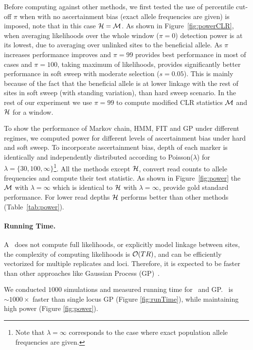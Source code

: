 \documentclass[11pt]{article}
\def\comale{\text{{\sc Comale}}}
\begin{document}
Before computing against other methods, we first tested the use of
percentile cut-off $\pi$ when with no ascertainment bias (exact allele frequencies are given) is imposed, note that in this case ${\cal H}={\cal M}$. 
As shown in Figure~\ref{fig:powerCLR}, when averaging likelihoods over the whole window ($\pi=0$) detection power is at its lowest, due to averaging over unlinked sites to the beneficial allele. As $\pi$ increases performance improves and $\pi=99$ provides best performance in most of cases and $\pi=100$, taking maximum of likelihoods, provides significantly better performance in soft sweep with moderate selection ($s=0.05$). This is mainly because of the fact that the beneficial allele is at lower linkage with the rest of sites in soft sweep (with standing variation), than hard sweep scenario. In the rest of our experiment we use $\pi=99$ to compute modified CLR statistics ${\cal M}$ and ${\cal H}$ for a window.

To show the performance of Markov chain, HMM, FIT and
GP under different regimes, we computed power for different levels of ascertainment bias under hard and soft sweep.
To incorporate ascertainment bias, depth of each marker is identically and independently distributed according to Poisson($\lambda$) for  $\lambda=\{30,100,\infty\}$\footnote{Note that $\lambda=\infty $ corresponds to the case where exact population allele frequencies are given.}. All the methods except ${\cal H}$, convert read counts to allele frequencies and compute their test statistic.
As shown in Figure~\ref{fig:power} the ${\cal M}$ with $\lambda =\infty$ which is identical to ${\cal H}$ with $\lambda =\infty$, provide gold standard performance. For lower read depths ${\cal H}$ performs better than other methods (Table~\ref{tab:power}). 

\paragraph{Running Time.}
A \comale\ does not compute full likelihoods, or explicitly model
linkage between sites, the complexity of computing likelihoods is
${\cal O}(TR)$, and can be efficiently vectorized for multiple replicates
and loci. Therefore, it is expected to be faster than other approaches
like Gaussian Process (GP)~\cite{Terhorst2015Multi}.

We conducted $1000$ simulations and measured running time for \comale\ 
and GP. \comale\  is $\sim 1000\times$ faster than single locus GP
(Figure \ref{fig:runTime}), while maintaining high power (Figure
\ref{fig:power}).
\end{document}
